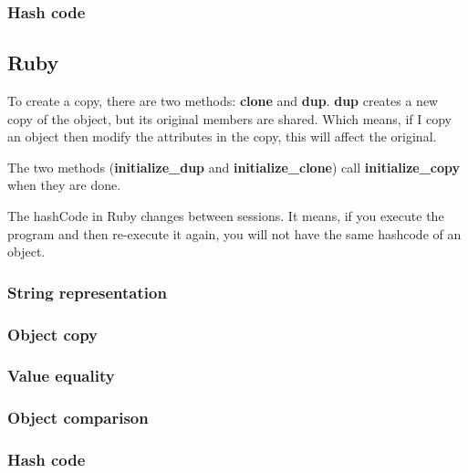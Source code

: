 \documentclass{KodeBook}
\begin{document}
\subsubsection{Hash code}

\subsection{Ruby}

To create a copy, there are two methods: \textbf{clone} and \textbf{dup}. 
\textbf{dup} creates a new copy of the object, but its original members are shared. 
Which means, if I copy an object then modify the attributes in the copy, this will affect the original.



The two methods (\textbf{initialize\_dup} and \textbf{initialize\_clone}) call \textbf{initialize\_copy} when they are done.


The hashCode in Ruby changes between sessions.
It means, if you execute the program and then re-execute it again, you will not have the same hashcode of an object.

\subsubsection{String representation}

\subsubsection{Object copy}

\subsubsection{Value equality}

\subsubsection{Object comparison}

\subsubsection{Hash code}

\ifx\wholebook\relax\else
% 
% 
	
\end{document}
